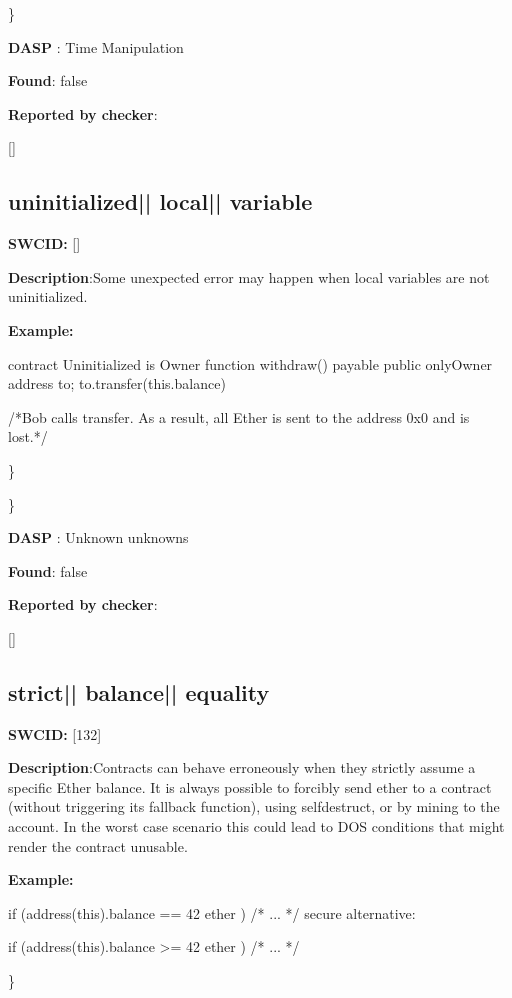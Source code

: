 \documentclass{article}
\begin{document}
\} 

\textbf{DASP} : Time Manipulation

\textbf{Found}: false

\textbf{Reported by checker}: 
\begin{ffcode} 

[]
\end{ffcode} 
\subsection{uninitialized{|\textunderscore| }local{|\textunderscore| }variable} 
\textbf{SWC{\textunderscore }ID:} []

\textbf{Description}:Some unexpected error may happen when local variables are not uninitialized.


\textbf{Example:} 
\begin{ffcode} 

contract Uninitialized is Owner{
    function withdraw() payable public onlyOwner{
        address to;
        to.transfer(this.balance)
    }
}

 /*Bob calls transfer. As a result, all Ether is sent to the address 0x0 and is lost.*/ 

\end{ffcode} 
\} 

\} 

\textbf{DASP} : Unknown unknowns

\textbf{Found}: false

\textbf{Reported by checker}: 
\begin{ffcode} 

[]
\end{ffcode} 
\subsection{strict{|\textunderscore| }balance{|\textunderscore| }equality} 
\textbf{SWC{\textunderscore }ID:} [132]

\textbf{Description}:Contracts can behave erroneously when they strictly assume a specific Ether balance. It is always possible to forcibly send ether to a contract (without triggering its fallback function), using selfdestruct, or by mining to the account. In the worst case scenario this could lead to DOS conditions that might render the contract unusable.


\textbf{Example:} 
\begin{ffcode} 

if (address(this).balance == 42 ether ) {
    /* ... */
}
 secure alternative:

if (address(this).balance >= 42 ether ) {
  /* ... */
}

\end{ffcode} 
\} 
\end{document}
